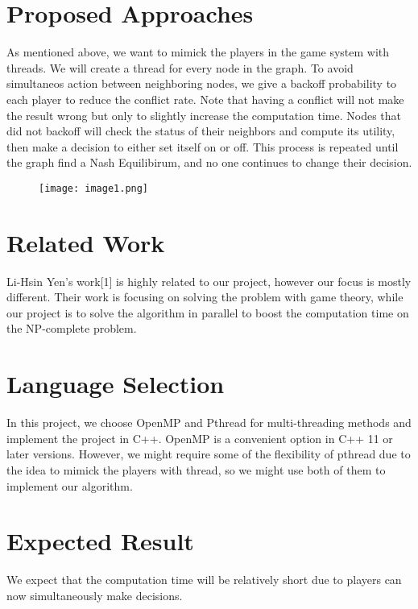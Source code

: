 \documentclass[sigconf]{acmart}
\begin{document}
\section{Proposed Approaches}
As mentioned above, we want to mimick the players in the game system with threads. We will create a thread for every node in the graph. To avoid simultaneos action between neighboring nodes, we give a backoff probability to each player to reduce the conflict rate. Note that having a conflict will not make the result wrong but only to slightly increase the computation time. Nodes that did not backoff will check the status of their neighbors and compute its utility, then make a decision to either set itself on or off. This process is repeated until the graph find a Nash Equilibirum, and no one continues to change their decision.

\begin{figure}[h]
	\texttt{[image: image1.png]}
\end{figure}
\section{Related Work}
Li-Hsin Yen's work[1] is highly related to our project, however our focus is mostly different. Their work is focusing on solving the problem with game theory, while our project is to solve the algorithm in parallel to boost the computation time on the NP-complete problem.

\section{Language Selection}
In this project, we choose OpenMP and Pthread for multi-threading methods and implement the project in C++. OpenMP is a convenient option in C++ 11 or later versions. However, we might require some of the flexibility of pthread due to the idea to mimick the players with thread, so we might use both of them to implement our algorithm. 



\section{Expected Result}
We expect that the computation time will be relatively short due to players can now simultaneously make decisions.
\end{document}
